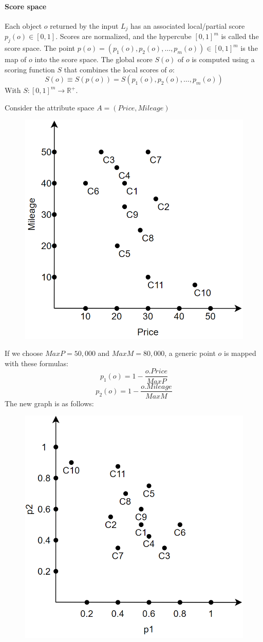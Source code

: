 \paragraph*{Score space}
Each object $o$ returned by the input $L_j$ has an associated local/partial score $p_j(o) \in [0,1]$. 
Scores are normalized, and the hypercube $[0,1]^m$ is called the score space.
The point $p(o) = (p_1(o), p_2(o), \dots, p_m(o)) \in [0,1]^m$ is the map of $o$ into the score space. 
The global score $S(o)$ of $o$ is computed using a scoring function $S$ that combines the local scores of $o$:
\[S(o) \equiv  S(p(o)) = S(p_1(o),p_2(o),\dots,p_m(o))\]
With $S:[0,1]^m \rightarrow \mathbb{R}^{+}$. 
\begin{example}
    Consider the attribute space $A = (Price,Mileage)$
    \begin{figure}[H]
        \centering
        \includegraphics[width=0.25\linewidth]{images/ex1.png}
    \end{figure}
    If we choose $MaxP = 50,000$ and $MaxM = 80,000$, a generic point $o$ is mapped with these formulas:
    \[p_1(o) = 1 - \dfrac{o.Price}{MaxP}\]
    \[p_2(o) = 1 - \dfrac{o.Mileage}{MaxM}\]
    The new graph is as follows: 
    \begin{figure}[H]
        \centering
        \includegraphics[width=0.3\linewidth]{images/ex2.png}
    \end{figure}
\end{example}

